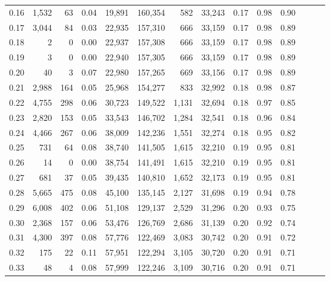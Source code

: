 \begin{tabular}{rrrrrrrrrrrrrr}
0.16 &   1,532 &     63 &  0.04 &   19,891 &  160,354 &     582 &  33,243 &  0.17 &  0.98 &      0.90 \\
0.17 &   3,044 &     84 &  0.03 &   22,935 &  157,310 &     666 &  33,159 &  0.17 &  0.98 &      0.89 \\
0.18 &       2 &      0 &  0.00 &   22,937 &  157,308 &     666 &  33,159 &  0.17 &  0.98 &      0.89 \\
0.19 &       3 &      0 &  0.00 &   22,940 &  157,305 &     666 &  33,159 &  0.17 &  0.98 &      0.89 \\
0.20 &      40 &      3 &  0.07 &   22,980 &  157,265 &     669 &  33,156 &  0.17 &  0.98 &      0.89 \\
0.21 &   2,988 &    164 &  0.05 &   25,968 &  154,277 &     833 &  32,992 &  0.18 &  0.98 &      0.87 \\
0.22 &   4,755 &    298 &  0.06 &   30,723 &  149,522 &   1,131 &  32,694 &  0.18 &  0.97 &      0.85 \\
0.23 &   2,820 &    153 &  0.05 &   33,543 &  146,702 &   1,284 &  32,541 &  0.18 &  0.96 &      0.84 \\
0.24 &   4,466 &    267 &  0.06 &   38,009 &  142,236 &   1,551 &  32,274 &  0.18 &  0.95 &      0.82 \\
0.25 &     731 &     64 &  0.08 &   38,740 &  141,505 &   1,615 &  32,210 &  0.19 &  0.95 &      0.81 \\
0.26 &      14 &      0 &  0.00 &   38,754 &  141,491 &   1,615 &  32,210 &  0.19 &  0.95 &      0.81 \\
0.27 &     681 &     37 &  0.05 &   39,435 &  140,810 &   1,652 &  32,173 &  0.19 &  0.95 &      0.81 \\
0.28 &   5,665 &    475 &  0.08 &   45,100 &  135,145 &   2,127 &  31,698 &  0.19 &  0.94 &      0.78 \\
0.29 &   6,008 &    402 &  0.06 &   51,108 &  129,137 &   2,529 &  31,296 &  0.20 &  0.93 &      0.75 \\
0.30 &   2,368 &    157 &  0.06 &   53,476 &  126,769 &   2,686 &  31,139 &  0.20 &  0.92 &      0.74 \\
0.31 &   4,300 &    397 &  0.08 &   57,776 &  122,469 &   3,083 &  30,742 &  0.20 &  0.91 &      0.72 \\
0.32 &     175 &     22 &  0.11 &   57,951 &  122,294 &   3,105 &  30,720 &  0.20 &  0.91 &      0.71 \\
0.33 &      48 &      4 &  0.08 &   57,999 &  122,246 &   3,109 &  30,716 &  0.20 &  0.91 &      0.71 \\

\end{tabular}
